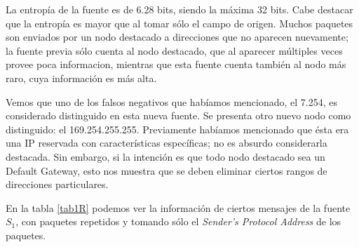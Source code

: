 \par La entropía de la fuente es de 6.28 bits, siendo la máxima 32 bits. 
Cabe destacar que la entropía es mayor que al tomar sólo el campo de origen. 
Muchos paquetes son enviados por un nodo destacado a direcciones que no aparecen nuevamente; la fuente previa sólo cuenta al nodo destacado, que al aparecer múltiples veces provee poca informacion, mientras que esta fuente cuenta también al nodo más raro, cuya información es más alta.

\par Vemos que uno de los falsos negativos que habíamos mencionado, el 7.254, es considerado distinguido en esta nueva fuente.
Se presenta otro nuevo nodo como distinguido: el 169.254.255.255. 
Previamente habíamos mencionado que ésta era una IP reservada con características específicas; no es absurdo considerarla destacada. 
Sin embargo, si la intención es que todo nodo destacado sea un Default Gateway, esto nos muestra que se deben eliminar ciertos rangos de direcciones particulares.

\par En la tabla \ref{tab1R} podemos ver la información de ciertos mensajes de la fuente $S_1$, con paquetes repetidos y tomando sólo el \textit{Sender's Protocol Address} de los paquetes.

